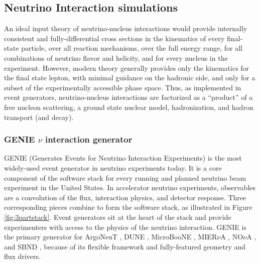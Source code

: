 \subsection{Neutrino Interaction simulations}

An ideal input theory of neutrino-nucleus interactions
 would provide internally consistent and fully-differential cross sections 
in the kinematics of every final-state particle, over all reaction mechanisms, over the full energy range, for all combinations of neutrino flavor and helicity, and for every nucleus in the experiment.
However, modern theory generally provides only the kinematics for the final state lepton, with minimal guidance on the hadronic side, and only for a subset of the experimentally accessible phase space.
Thus, as implemented in event generators, neutrino-nucleus interactions are factorized as a ``product'' of a free nucleon scattering, a ground state nuclear model, hadronization, and hadron transport (and decay).

\subsubsection{GENIE $\nu$ interaction generator}

GENIE (Generates Events for Neutrino Interaction Experiments) \cite{Andreopoulos:2009rq} is the most widely-used event generator in neutrino experiments today.
It is a core component of the software stack for every running and planned neutrino beam experiment in the United States.
In accelerator neutrino experiments, observables are a convolution of the flux, interaction physics, and detector response. 
Three corresponding pieces combine to form the software stack, as illustrated in Figure \ref{fig:3partstack}.
Event generators sit at the heart of the stack and provide experimenters with access to the physics of the neutrino interaction. GENIE is the primary generator for 
ArgoNeuT \cite{Anderson:2012vc}, 
DUNE \cite{Acciarri:2015uup}, 
MicroBooNE \cite{Fleming:2012gvl}, 
MIER$\nu$A \cite{MINERvA:2006aa}, 
NO$\nu$A \cite{Ayres:2007tu}, 
and SBND \cite{Antonello:2015lea,sbnd}, 
because of its flexible framework and fully-featured geometry and flux drivers.

